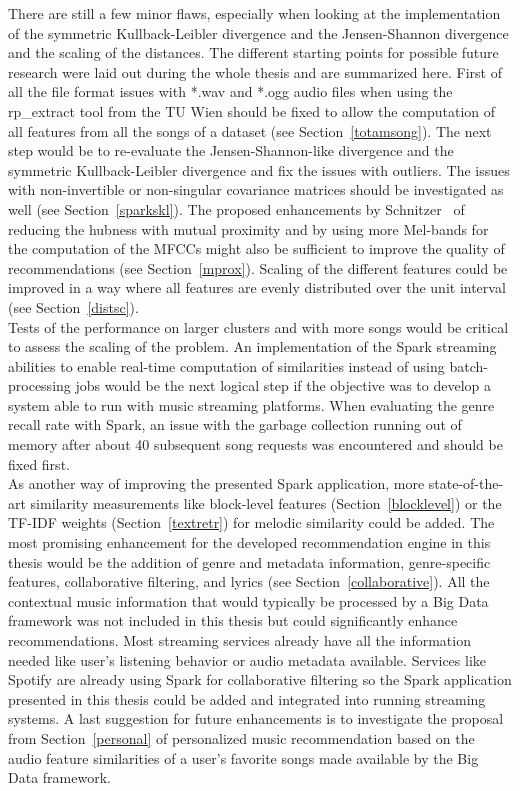 There are still a few minor flaws, especially when looking at the implementation of the symmetric Kullback-Leibler divergence and the Jensen-Shannon divergence and the scaling of the distances. The different starting points for possible future research were laid out during the whole thesis and are summarized here. First of all the file format issues with *.wav and *.ogg audio files when using the rp\_extract tool from the TU Wien should be fixed to allow the computation of all features from all the songs of a dataset (see Section~\ref{totamsong}).
The next step would be to re-evaluate the Jensen-Shannon-like divergence and the symmetric Kullback-Leibler divergence and fix the issues with outliers. The issues with non-invertible or non-singular covariance matrices should be investigated as well (see Section~\ref{sparkskl}). The proposed enhancements by Schnitzer~\cite{schnitzer1} of reducing the hubness with mutual proximity and by using more Mel-bands for the computation of the MFCCs might also be sufficient to improve the quality of recommendations (see Section~\ref{mprox}). Scaling of the different features could be improved in a way where all features are evenly distributed over the unit interval (see Section~\ref{distsc}).\\
Tests of the performance on larger clusters and with more songs would be critical to assess the scaling of the problem.
An implementation of the Spark streaming abilities to enable real-time computation of similarities instead of using batch-processing jobs would be the next logical step if the objective was to develop a system able to run with music streaming platforms. When evaluating the genre recall rate with Spark, an issue with the garbage collection running out of memory after about 40 subsequent song requests was encountered and should be fixed first.\\
\noindent As another way of improving the presented Spark application, more state-of-the-art similarity measurements like block-level features (Section~\ref{blocklevel}) or the TF-IDF weights (Section~\ref{textretr}) for melodic similarity could be added. The most promising enhancement for the developed recommendation engine in this thesis would be the addition of genre and metadata information, genre-specific features, collaborative filtering, and lyrics (see Section~\ref{collaborative}). All the contextual music information that would typically be processed by a Big Data framework was not included in this thesis but could significantly enhance recommendations. Most streaming services already have all the information needed like user's listening behavior or audio metadata available. Services like Spotify are already using Spark for collaborative filtering so the Spark application presented in this thesis could be added and integrated into running streaming systems. A last suggestion for future enhancements is to investigate the proposal from Section~\ref{personal} of personalized music recommendation based on the audio feature similarities of a user's favorite songs made available by the Big Data framework.

